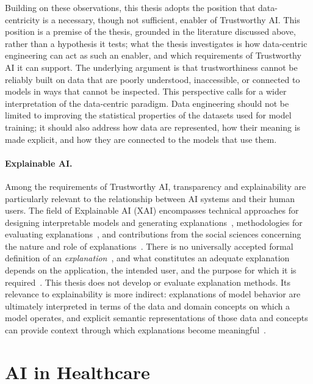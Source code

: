 Building on these observations, this thesis adopts the position that data-centricity is a necessary, though not sufficient, enabler of Trustworthy AI. This position is a premise of the thesis, grounded in the literature discussed above, rather than a hypothesis it tests; what the thesis investigates is how data-centric engineering can act as such an enabler, and which requirements of Trustworthy AI it can support. The underlying argument is that trustworthiness cannot be reliably built on data that are poorly understood, inaccessible, or connected to models in ways that cannot be inspected. This perspective calls for a wider interpretation of the data-centric paradigm. Data engineering should not be limited to improving the statistical properties of the datasets used for model training; it should also address how data are represented, how their meaning is made explicit, and how they are connected to the models that use them.

\paragraph{Explainable AI.}
Among the requirements of Trustworthy AI, transparency and explainability are particularly relevant to the relationship between AI systems and their human users. The field of Explainable AI (XAI) encompasses technical approaches for designing interpretable models and generating explanations~\cite{guidotti_survey_2019}, methodologies for evaluating explanations~\cite{lekadir_future-ai_2025}, and contributions from the social sciences concerning the nature and role of explanations~\cite{miller_explanation_2019}. There is no universally accepted formal definition of an \emph{explanation}~\cite{miller_explanation_2019}, and what constitutes an adequate explanation depends on the application, the intended user, and the purpose for which it is required~\cite{murdoch_interpretable_2019}. This thesis does not develop or evaluate explanation methods. Its relevance to explainability is more indirect: explanations of model behavior are ultimately interpreted in terms of the data and domain concepts on which a model operates, and explicit semantic representations of those data and concepts can provide context through which explanations become meaningful~\cite{corbucci_semantic_2023,panigutti_role_2023}.

\section{AI in Healthcare}
\label{ai_in_healthcare}

